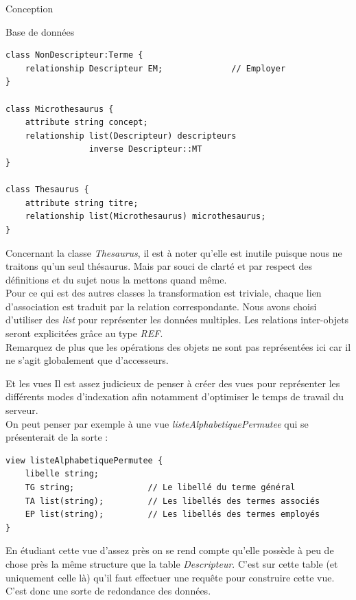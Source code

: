 \documentclass[a4paper, 12pt]{report}
\begin{document}
\begin{chapter}{Conception}
\begin{section}{Base de données}
\begin{verbatim}
class NonDescripteur:Terme {
	relationship Descripteur EM;              // Employer
}

class Microthesaurus {
	attribute string concept;
	relationship list(Descripteur) descripteurs
	             inverse Descripteur::MT
}

class Thesaurus {
	attribute string titre;
	relationship list(Microthesaurus) microthesaurus;
}
	\end{verbatim}

	Concernant la classe \emph{Thesaurus}, il est à noter qu'elle est
	inutile puisque nous ne traitons qu'un seul thésaurus. Mais par souci de clarté et par respect des définitions et du sujet 
	nous la mettons quand même.\\


	Pour ce qui est des autres classes la transformation est triviale, chaque lien d'association est traduit par la relation
	correspondante. Nous avons choisi d'utiliser des \emph{list} pour représenter les données multiples. Les relations inter-objets seront
	explicitées grâce au type \emph{REF}.\\

	Remarquez de plus que les opérations des objets ne sont pas représentées ici car il ne s'agit globalement que d'accesseurs.\\
	\end{section}

	\begin{section}{Et les vues}
		Il est assez judicieux de penser à créer des vues pour représenter les différents modes d'indexation afin notamment d'optimiser le temps
		de travail du serveur. \\
		On peut penser par exemple à une vue \emph{listeAlphabetiquePermutee} qui se présenterait de la sorte :\\
		\begin{verbatim}
view listeAlphabetiquePermutee {
	libelle string;
	TG string;               // Le libellé du terme général
	TA list(string);         // Les libellés des termes associés
	EP list(string);         // Les libellés des termes employés
}
		\end{verbatim}

		En étudiant cette vue d'assez près on se rend compte qu'elle possède à peu de chose près la même structure que la table \emph{Descripteur}.
		C'est sur cette table (et uniquement celle là) qu'il faut effectuer une requête pour construire cette vue. C'est donc une sorte de redondance
		des données.\\


\end{section}
\end{chapter}
\end{document}
